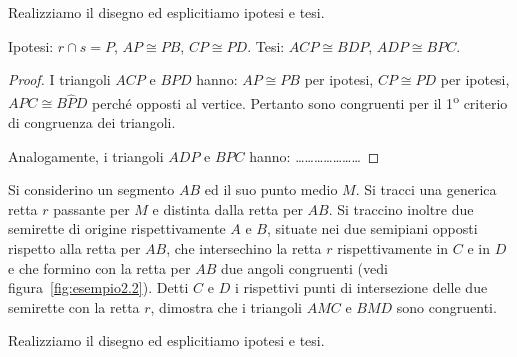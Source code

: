 \begin{exrig}
\begin{esempio}
\begin{multicols}{2}
Realizziamo il disegno ed esplicitiamo ipotesi e tesi.

\noindent Ipotesi: \(r\cap s=P\), \(AP\cong PB\), \(CP\cong PD\).\tab\tab 
Tesi: \(ACP\cong BDP\), \(ADP\cong BPC\).

\begin{proof}
I triangoli \(ACP\) e \(BPD\) hanno: \(AP\cong PB\) per ipotesi, \(CP\cong 
PD\) per ipotesi, \(A\widehat{P}C\cong B\widehat{P}D\) perché opposti al 
vertice. Pertanto sono congruenti per il 1\textsuperscript{o} 
criterio di congruenza dei triangoli.
\begin{center}
\begin{inaccessibleblock}

\end{inaccessibleblock}
\end{center}

Analogamente, i triangoli \(ADP\) e \(BPC\) hanno: 
\ldots\ldots\ldots\ldots\ldots\ldots\ldots
\end{proof}
\end{multicols}

\end{esempio}

\begin{esempio}\label{esempio:2.2}
Si considerino un segmento \(AB\) ed il suo punto medio \(M\). Si tracci 
una generica retta \(r\) passante per \(M\) e distinta dalla retta per 
\(AB\). Si traccino inoltre due semirette di origine rispettivamente 
\(A\) e \(B\), situate nei due semipiani opposti rispetto alla retta per 
\(AB\), che intersechino la retta \(r\) rispettivamente in \(C\) e in \(D\) e 
che formino con la retta per \(AB\) due angoli congruenti (vedi 
figura~\ref{fig:esempio2.2}). Detti \(C\) e \(D\) i rispettivi punti di 
intersezione delle due semirette con la retta \(r\), dimostra che i 
triangoli \(AMC\) e \(BMD\) sono congruenti.



\begin{multicols}{2}
Realizziamo il disegno ed esplicitiamo ipotesi e tesi.


\end{multicols}
\end{esempio}
\end{exrig}
